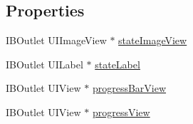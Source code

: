 \subsection*{Properties}
\begin{DoxyCompactItemize}
\item 
I\-B\-Outlet U\-I\-Image\-View $\ast$ \hyperlink{interface_w_upload_collection_header_ad72738ced1fbb13d02a4d013b9f2f305}{state\-Image\-View}
\item 
I\-B\-Outlet U\-I\-Label $\ast$ \hyperlink{interface_w_upload_collection_header_abb3b1f97fccd1b14a009553b08d17ca6}{state\-Label}
\item 
I\-B\-Outlet U\-I\-View $\ast$ \hyperlink{interface_w_upload_collection_header_ae9232980e7727950196e8f5d3fd70ec2}{progress\-Bar\-View}
\item 
I\-B\-Outlet U\-I\-View $\ast$ \hyperlink{interface_w_upload_collection_header_a5b9afcb843c9b51713bb20e0a875d736}{progress\-View}
\end{DoxyCompactItemize}


